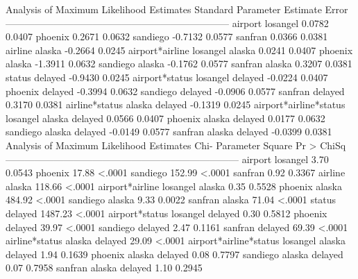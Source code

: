 \documentclass{article}
\begin{document}
\begin{Woutput}
              Analysis of Maximum Likelihood Estimates
                                                             Standard
Parameter                                         Estimate      Error
---------------------------------------------------------------------
airport                losangel                     0.0782     0.0407
                       phoenix                      0.2671     0.0632
                       sandiego                    -0.7132     0.0577
                       sanfran                      0.0366     0.0381
airline                alaska                      -0.2664     0.0245
airport*airline        losangel alaska              0.0241     0.0407
                       phoenix alaska              -1.3911     0.0632
                       sandiego alaska             -0.1762     0.0577
                       sanfran alaska               0.3207     0.0381
status                 delayed                     -0.9430     0.0245
airport*status         losangel delayed            -0.0224     0.0407
                       phoenix delayed             -0.3994     0.0632
                       sandiego delayed            -0.0906     0.0577
                       sanfran delayed              0.3170     0.0381
airline*status         alaska delayed              -0.1319     0.0245
airport*airline*status losangel alaska delayed      0.0566     0.0407
                       phoenix alaska delayed       0.0177     0.0632
                       sandiego alaska delayed     -0.0149     0.0577
                       sanfran alaska delayed      -0.0399     0.0381
                Analysis of Maximum Likelihood Estimates
                                                      Chi-
Parameter                                           Square    Pr > ChiSq
------------------------------------------------------------------------
airport                losangel                       3.70        0.0543
                       phoenix                       17.88        <.0001
                       sandiego                     152.99        <.0001
                       sanfran                        0.92        0.3367
airline                alaska                       118.66        <.0001
airport*airline        losangel alaska                0.35        0.5528
                       phoenix alaska               484.92        <.0001
                       sandiego alaska                9.33        0.0022
                       sanfran alaska                71.04        <.0001
status                 delayed                     1487.23        <.0001
airport*status         losangel delayed               0.30        0.5812
                       phoenix delayed               39.97        <.0001
                       sandiego delayed               2.47        0.1161
                       sanfran delayed               69.39        <.0001
airline*status         alaska delayed                29.09        <.0001
airport*airline*status losangel alaska delayed        1.94        0.1639
                       phoenix alaska delayed         0.08        0.7797
                       sandiego alaska delayed        0.07        0.7958
                       sanfran alaska delayed         1.10        0.2945


\end{Woutput}
\end{document}
